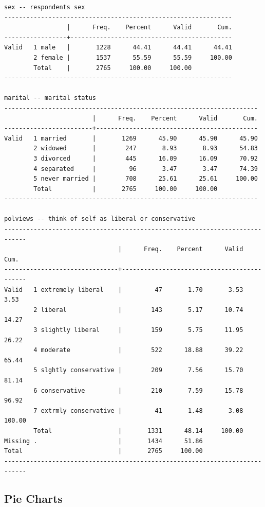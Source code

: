 \documentclass[
]{book}
\begin{document}
\begin{verbatim}
sex -- respondents sex
--------------------------------------------------------------
                 |      Freq.    Percent      Valid       Cum.
-----------------+--------------------------------------------
Valid   1 male   |       1228      44.41      44.41      44.41
        2 female |       1537      55.59      55.59     100.00
        Total    |       2765     100.00     100.00           
--------------------------------------------------------------

marital -- marital status
---------------------------------------------------------------------
                        |      Freq.    Percent      Valid       Cum.
------------------------+--------------------------------------------
Valid   1 married       |       1269      45.90      45.90      45.90
        2 widowed       |        247       8.93       8.93      54.83
        3 divorced      |        445      16.09      16.09      70.92
        4 separated     |         96       3.47       3.47      74.39
        5 never married |        708      25.61      25.61     100.00
        Total           |       2765     100.00     100.00           
---------------------------------------------------------------------

polviews -- think of self as liberal or conservative
----------------------------------------------------------------------------
                               |      Freq.    Percent      Valid       Cum.
-------------------------------+--------------------------------------------
Valid   1 extremely liberal    |         47       1.70       3.53       3.53
        2 liberal              |        143       5.17      10.74      14.27
        3 slightly liberal     |        159       5.75      11.95      26.22
        4 moderate             |        522      18.88      39.22      65.44
        5 slghtly conservative |        209       7.56      15.70      81.14
        6 conservative         |        210       7.59      15.78      96.92
        7 extrmly conservative |         41       1.48       3.08     100.00
        Total                  |       1331      48.14     100.00           
Missing .                      |       1434      51.86                      
Total                          |       2765     100.00                      
----------------------------------------------------------------------------
\end{verbatim}

\subsection{Pie Charts}\label{pie-charts}
\end{document}
